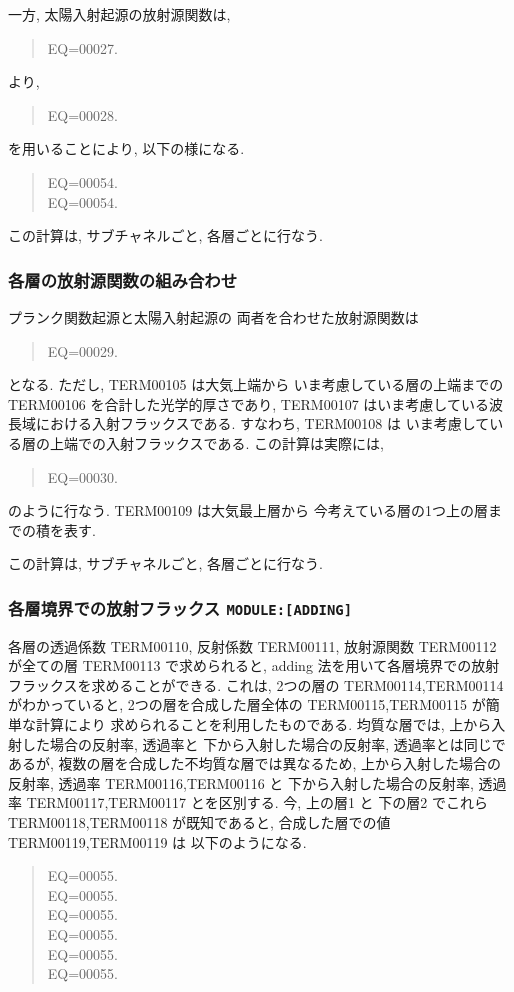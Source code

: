 一方,  太陽入射起源の放射源関数は,
\begin{quote}
EQ=00027.
\end{quote}
より,
\begin{quote}
EQ=00028.
\end{quote}
を用いることにより, 以下の様になる.
\begin{quote}
EQ=00054.\\
EQ=00054.
\end{quote}

この計算は, サブチャネルごと, 各層ごとに行なう.

\subsubsection{各層の放射源関数の組み合わせ}

プランク関数起源と太陽入射起源の
両者を合わせた放射源関数は
\begin{quote}
EQ=00029.
\end{quote}
となる. ただし, TERM00105 は大気上端から
いま考慮している層の上端までの
TERM00106 を合計した光学的厚さであり, 
TERM00107 はいま考慮している波長域における入射フラックスである.
すなわち, TERM00108 は
いま考慮している層の上端での入射フラックスである.
%
この計算は実際には, 
\begin{quote}
EQ=00030.
\end{quote}
のように行なう. TERM00109 は大気最上層から
今考えている層の1つ上の層までの積を表す.

この計算は, サブチャネルごと, 各層ごとに行なう.

\subsubsection{各層境界での放射フラックス \texttt{MODULE:[ADDING]}}

各層の透過係数 TERM00110, 反射係数 TERM00111, 放射源関数 TERM00112
が全ての層 TERM00113 で求められると,
adding 法を用いて各層境界での放射フラックスを求めることができる.
これは, 2つの層の TERM00114,TERM00114 がわかっていると,
2つの層を合成した層全体の TERM00115,TERM00115 が簡単な計算により
求められることを利用したものである.
均質な層では, 上から入射した場合の反射率, 透過率と
下から入射した場合の反射率, 透過率とは同じであるが,
複数の層を合成した不均質な層では異なるため,
上から入射した場合の反射率, 透過率 TERM00116,TERM00116 と
下から入射した場合の反射率, 透過率 TERM00117,TERM00117 とを区別する.
今, 上の層1 と 下の層2 でこれら
TERM00118,TERM00118 が既知であると,
合成した層での値
TERM00119,TERM00119 は
以下のようになる.
\begin{quote}
EQ=00055.\\
EQ=00055.\\
EQ=00055.\\
EQ=00055.\\
EQ=00055.\\
EQ=00055.
\end{quote}

